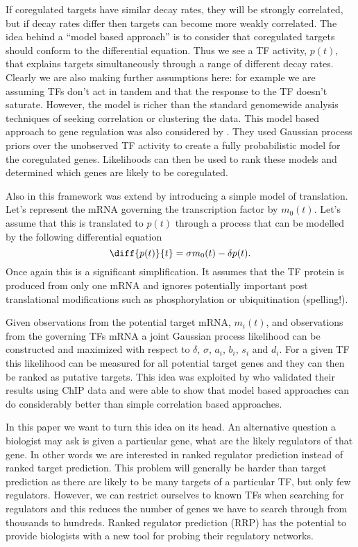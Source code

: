 \documentclass{article}
\begin{document}
If coregulated targets have similar decay rates, they will be strongly
correlated, but  if decay  rates differ then  targets can  become more
weakly correlated.  The  idea behind a ``model based  approach'' is to
consider that  coregulated targets should conform  to the differential
equation. Thus  we see  a TF activity,  $p(t)$, that  explains targets
simultaneously through  a range of different decay  rates.  Clearly we
are also making further assumptions  here: for example we are assuming
TFs  don't act  in tandem  and  that the  response to  the TF  doesn't
saturate. However,  the model is  richer than the  standard genomewide
analysis   techniques  of  seeking   correlation  or   clustering  the
data. This model based approach to gene regulation was also considered
by  \cite{Gao:latent08}. They  used Gaussian  process priors  over the
unobserved TF activity  to create a fully probabilistic  model for the
coregulated genes.  Likelihoods can then  be used to rank these models
and determined which genes are likely to be coregulated.

Also in \cite{Gao:latent08} this framework was extend by introducing a
simple model  of translation.  Let's represent the  mRNA governing the
transcription factor by $m_0(t)$. Let's assume that this is translated
to  $p(t)$ through a  process that  can be  modelled by  the following
differential equation
\[
\diff{p(t)}{t} = \sigma m_0(t) - \delta p(t).
\]
Once again this  is a significant simplification. It  assumes that the
TF  protein is  produced from  only one  mRNA and  ignores potentially
important post translational  modifications such as phosphorylation or
ubiquitination (spelling!).

Given  observations  from the  potential  target  mRNA, $m_i(t)$,  and
observations  from the  governing TFs  mRNA a  joint  Gaussian process
likelihood can be constructed  and maximized with respect to $\delta$,
$\sigma$,  $a_i$,  $b_i$,  $s_i$  and  $d_i$.  For  a  given  TF  this
likelihood can be measured for all potential target genes and they can
then  be  ranked as  putative  targets.  This  idea was  exploited  by
\cite{Honkela:} who  validated their results using ChIP  data and were
able to  show that model  based approaches can do  considerably better
than simple correlation based approaches.

In this  paper we want to turn  this idea on its  head. An alternative
question a biologist may ask is  given a particular gene, what are the
likely regulators  of that gene. In  other words we  are interested in
ranked regulator prediction instead  of ranked target prediction. This
problem will generally  be harder than target prediction  as there are
likely  to  be  many  targets   of  a  particular  TF,  but  only  few
regulators.  However, we  can  restrict ourselves  to  known TFs  when
searching for regulators and this  reduces the number of genes we have
to  search  through  from  thousands  to  hundreds.  Ranked  regulator
prediction (RRP)  has the potential  to provide biologists with  a new
tool for probing their regulatory networks.
\end{document}
